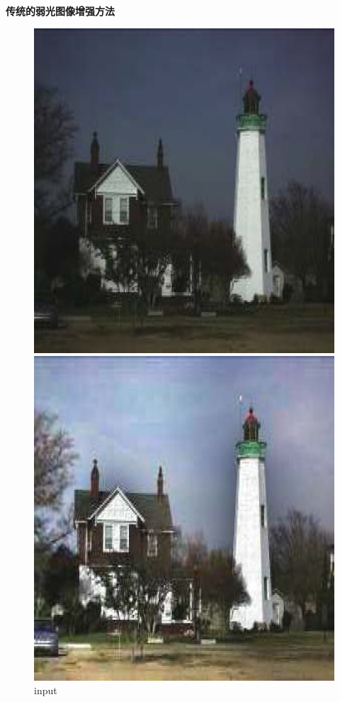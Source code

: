 \documentclass[CJK,aspectratio=169]{beamer}  %
\begin{document}
	\begin{frame}
		{ \yahei \textbf{传统的弱光图像增强方法}}
		
		\begin{figure}[htbp] 
			\centering
			\setlength{\abovecaptionskip}{-0.03cm}
			\begin{minipage}{0.18\textwidth}
				\includegraphics[width=\linewidth]{picture/LLIE/Retinex Model/input}
				\captionsetup{font=scriptsize}
				\caption*{\tiny input}
				\label{fig: Retinex Model_input}
			\end{minipage}
			\begin{minipage}{0.18\textwidth}
				\includegraphics[width=\linewidth]{picture/LLIE/Retinex Model/Retinex}

\end{minipage}
\end{figure}
\end{frame}
\end{document}
